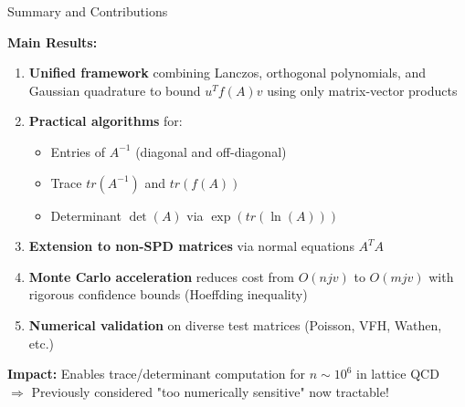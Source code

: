 \documentclass[aspectratio=169, 12pt]{beamer}
\begin{document}
\begin{frame}{Summary and Contributions}

\textbf{Main Results:}

\begin{enumerate}
    \item \textbf{Unified framework} combining Lanczos, orthogonal polynomials, and Gaussian quadrature to bound \(u^T f(A) v\) using only matrix-vector products
    
    \item \textbf{Practical algorithms} for:
    \begin{itemize}
        \item Entries of \(A^{-1}\) (diagonal and off-diagonal)
        \item Trace \(tr(A^{-1})\) and \(tr(f(A))\)
        \item Determinant \(\det(A)\) via \(\exp(tr(\ln(A)))\)
    \end{itemize}
    
    \item \textbf{Extension to non-SPD matrices} via normal equations \(A^T A\)
    
    \item \textbf{Monte Carlo acceleration} reduces cost from \(O(njv)\) to \(O(mjv)\) with rigorous confidence bounds (Hoeffding inequality)
    
    \item \textbf{Numerical validation} on diverse test matrices (Poisson, VFH, Wathen, etc.)
\end{enumerate}

\vspace{0.3cm}

\textbf{Impact:} Enables trace/determinant computation for \(n \sim 10^6\) in lattice QCD \\
\(\Rightarrow\) Previously considered "too numerically sensitive" now tractable!

\end{frame}
\end{document}
